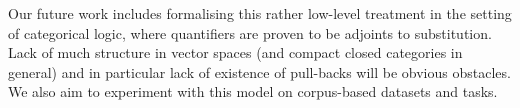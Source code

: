 Our future work includes formalising this rather low-level treatment in the setting of categorical logic, where quantifiers are proven to be adjoints to substitution. Lack of much structure in vector spaces (and compact closed categories in general) and in particular lack of existence of pull-backs will be obvious obstacles. We also aim to experiment with this model on corpus-based datasets and tasks. 



